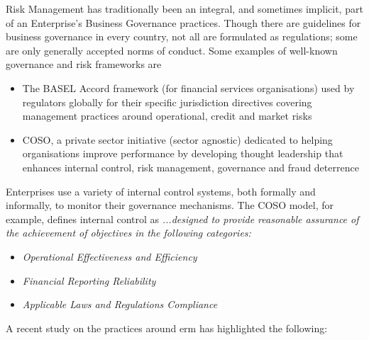 %
%

Risk Management has traditionally been an integral, and sometimes implicit, part of an Enterprise’s
Business Governance practices.
Though there are guidelines for business governance in every country, not all are formulated as regulations;
some are only generally accepted norms of conduct\autocite{integration_of_risk_management}.
Some examples of well-known governance and risk frameworks are

\begin{itemize}
    \item The BASEL Accord framework (for financial services organisations) used by regulators globally for their
          specific jurisdiction directives covering management practices around operational, credit and market risks
    \item COSO, a private sector initiative (sector agnostic) dedicated to helping organisations improve
          performance by developing thought leadership that enhances internal control, risk management,
          governance and fraud deterrence
\end{itemize}

Enterprises use a variety of internal control systems, both formally and informally,
to monitor their governance mechanisms.
The COSO model\autocite{erm_integrating_with_strategy_and_performance},
for example, defines internal control as
\textit{...designed to provide reasonable assurance of the achievement of objectives in the following categories:}

\begin{itemize}
    \item \textit{Operational Effectiveness and Efficiency}
    \item \textit{Financial Reporting Reliability}
    \item \textit{Applicable Laws and Regulations Compliance}
\end{itemize}

A recent study\autocite{erm_integrating_with_strategy_and_performance}
on the practices around \gls{erm} has highlighted the following:

